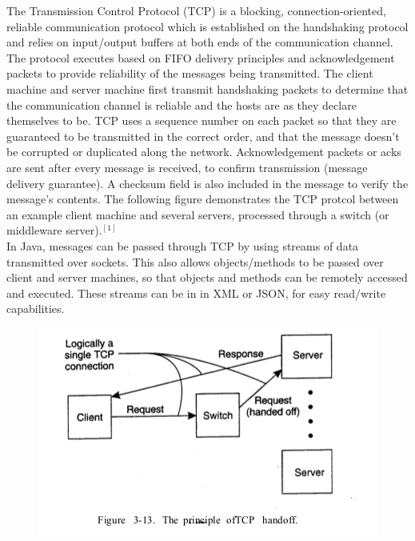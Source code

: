 \documentclass[letterpaper,12pt]{article}
\begin{document}
	The Transmission Control Protocol (TCP) is a blocking, connection-oriented, reliable communication protocol which is established on the handshaking protocol and relies on input/output buffers at both ends of the communication channel. The protocol executes based on FIFO delivery principles and acknowledgement packets to provide reliability of the messages being transmitted. The client machine and server machine first transmit handshaking packets to determine that the communication channel is reliable and the hosts are as they declare themselves to be. TCP uses a sequence number on each packet so that they are guaranteed to be transmitted in the correct order, and that the message doesn't be corrupted or duplicated along the network. Acknowledgement packets or acks are sent after every message is received, to confirm transmission (message delivery guarantee). A checksum field is also included in the message to verify the message's contents. The following figure demonstrates the TCP protcol between an example client machine and several servers, processed through a switch (or middleware server)$.^{[1]}$\\
	
	
	In Java, messages can be passed through TCP by using streams of data transmitted over sockets. This also allows objects/methods to be passed over client and server machines, so that objects and methods can be remotely accessed and executed. These streams can be in in XML or JSON, for easy read/write capabilities.
	
	\begin{figure}[ht] 
		\centering \includegraphics[width=0.8\columnwidth]{figure2.png}
		
	\end{figure} 
	\pagebreak
	
\end{document}
